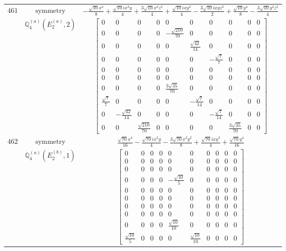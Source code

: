 \documentclass[fleqn,8pt,landscape]{jsarticle}
\begin{document}
\begin{longtable}{ccc}
$ 461 $ & $ \text{symmetry} $ & $ - \frac{\sqrt{10} x^{4}}{8} + \frac{\sqrt{10} i x^{3} y}{4} + \frac{3 \sqrt{10} x^{2} z^{2}}{4} + \frac{\sqrt{10} i x y^{3}}{4} - \frac{3 \sqrt{10} i x y z^{2}}{2} + \frac{\sqrt{10} y^{4}}{8} - \frac{3 \sqrt{10} y^{2} z^{2}}{4} $ \\
$  $ & $ \mathbb{Q}_{4}^{(a)}(E_{2}^{(a)},2) $ & $ \begin{bmatrix} 0 & 0 & 0 & 0 & 0 & 0 & 0 & 0 & 0 & 0 \\ 0 & 0 & 0 & 0 & - \frac{\sqrt{210}}{70} & 0 & 0 & 0 & 0 & 0 \\ 0 & 0 & 0 & 0 & 0 & \frac{\sqrt{42}}{14} & 0 & 0 & 0 & 0 \\ 0 & 0 & 0 & 0 & 0 & 0 & - \frac{\sqrt{7}}{7} & 0 & 0 & 0 \\ 0 & 0 & 0 & 0 & 0 & 0 & 0 & 0 & 0 & 0 \\ 0 & 0 & 0 & 0 & 0 & 0 & 0 & 0 & 0 & 0 \\ 0 & 0 & 0 & 0 & \frac{3 \sqrt{35}}{70} & 0 & 0 & 0 & 0 & 0 \\ \frac{\sqrt{7}}{7} & 0 & 0 & 0 & 0 & - \frac{\sqrt{7}}{14} & 0 & 0 & 0 & 0 \\ 0 & - \frac{\sqrt{42}}{14} & 0 & 0 & 0 & 0 & - \frac{\sqrt{7}}{14} & 0 & 0 & 0 \\ 0 & 0 & \frac{\sqrt{210}}{70} & 0 & 0 & 0 & 0 & \frac{3 \sqrt{35}}{70} & 0 & 0 \end{bmatrix} $ \\ \hline
$ 462 $ & $ \text{symmetry} $ & $ \frac{\sqrt{70} x^{4}}{16} - \frac{\sqrt{70} i x^{3} y}{4} - \frac{3 \sqrt{70} x^{2} y^{2}}{8} + \frac{\sqrt{70} i x y^{3}}{4} + \frac{\sqrt{70} y^{4}}{16} $ \\
$  $ & $ \mathbb{Q}_{4}^{(a)}(E_{2}^{(b)},1) $ & $ \begin{bmatrix} 0 & 0 & 0 & 0 & 0 & 0 & 0 & 0 & 0 & 0 \\ 0 & 0 & 0 & 0 & 0 & 0 & 0 & 0 & 0 & 0 \\ 0 & 0 & 0 & 0 & 0 & 0 & 0 & 0 & 0 & 0 \\ 0 & 0 & 0 & 0 & - \frac{\sqrt{10}}{5} & 0 & 0 & 0 & 0 & 0 \\ 0 & 0 & 0 & 0 & 0 & 0 & 0 & 0 & 0 & 0 \\ 0 & 0 & 0 & 0 & 0 & 0 & 0 & 0 & 0 & 0 \\ 0 & 0 & 0 & 0 & 0 & 0 & 0 & 0 & 0 & 0 \\ 0 & 0 & 0 & 0 & 0 & 0 & 0 & 0 & 0 & 0 \\ 0 & 0 & 0 & 0 & \frac{\sqrt{10}}{10} & 0 & 0 & 0 & 0 & 0 \\ \frac{\sqrt{10}}{5} & 0 & 0 & 0 & 0 & \frac{\sqrt{10}}{10} & 0 & 0 & 0 & 0 \end{bmatrix} $ \\ \hline

\end{longtable}
\end{document}
